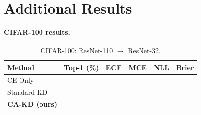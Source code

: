 \documentclass{article}
\begin{document}
\section{Additional Results}
\label{app:additional}

\paragraph{CIFAR-100 results.}
\begin{table}[h]
\centering
\caption{CIFAR-100: ResNet-110 $\to$ ResNet-32.}
\begin{tabular}{lccccc}
\toprule
Method & Top-1 (\%) & ECE & MCE & NLL & Brier \\
\midrule
CE Only               & — & — & — & — & — \\
Standard KD           & — & — & — & — & — \\
\textbf{CA-KD (ours)} & \textbf{—} & \textbf{—} & \textbf{—} & \textbf{—} & \textbf{—} \\
\bottomrule
\end{tabular}
\end{table}
\end{document}
